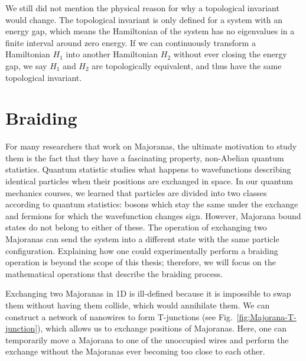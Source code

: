 We still did not mention the physical reason for why a topological invariant would change.
The topological invariant is only defined for a system with an energy gap, which means the Hamiltonian of the system has no eigenvalues in a finite interval around zero energy.
If we can continuously transform a Hamiltonian $H_{1}$ into another Hamiltonian $H_{2}$ without ever closing the energy gap, we say $H_{1}$ and $H_{2}$ are topologically equivalent, and thus have the same topological invariant.


\section{\label{sec:braiding}Braiding}

For many researchers that work on Majoranas, the ultimate motivation to study them is the fact that they have a fascinating property, non-Abelian quantum statistics.
Quantum statistic studies what happens to wavefunctions describing identical particles when their positions are exchanged in space.
In our quantum mechanics courses, we learned that particles are divided into two classes according to quantum statistics: bosons which stay the same under the exchange and fermions for which the wavefunction changes sign.
However, Majorana bound states do not belong to either of these.
The operation of exchanging two Majoranas can send the system into a different state with the same particle configuration.
Explaining how one could experimentally perform a braiding operation is beyond the scope of this thesis; therefore, we will focus on the mathematical operations that describe the braiding process.

Exchanging two Majoranas in 1D is ill-defined because it is impossible to swap them without having them collide, which would annihilate them.
We can construct a network of nanowires to form T-junctions (see Fig.~\ref{fig:Majorana-T-junction}), which allows us to exchange positions of Majoranas.
Here, one can temporarily move a Majorana to one of the unoccupied wires and perform the exchange without the Majoranas ever becoming too close to each other.


